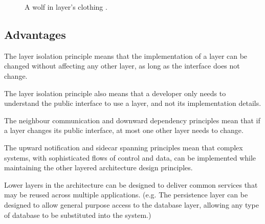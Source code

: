 \begin{figure}[ht]
    \centering
    \caption{A wolf in layer's clothing \cite{bass2013software}.}
    \label{fig:wolf}
\end{figure}

\subsection{Advantages}
The layer isolation principle means that the implementation of a layer can be changed without affecting any other layer,
as long as the interface does not change.

The layer isolation principle also means that a developer only needs to understand the public interface to use a layer, and not its implementation details.

The neighbour communication and downward dependency principles mean that if a layer changes its public interface, at most one other layer needs to change.

The upward notification and sidecar spanning principles mean that complex systems, with sophisticated flows of control and data,
can be implemented while maintaining the other layered architecture design principles.

Lower layers in the architecture can be designed to deliver common services that may be reused across multiple applications.
(e.g. The persistence layer can be designed to allow general purpose access to the database layer, allowing any type of database to be substituted into the system.)

